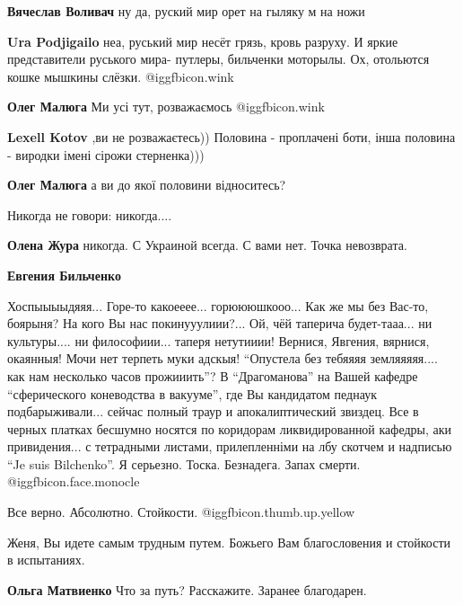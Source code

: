\begin{itemize}
\begin{itemize}
\textbf{Вячеслав Воливач} ну да, руский мир орет на гыляку м на ножи

\textbf{Ura Podjigailo} неа, руський мир несёт грязь, кровь разруху. И яркие представители руського мира- путлеры, бильченки моторылы. Ох, отольются кошке мышкины слёзки. @igg{fbicon.wink} 

\textbf{Олег Малюга} Ми усі тут, розважаємось  @igg{fbicon.wink} 

\textbf{Lexell Kotov} ,ви не розважаєтесь)) Половина - проплачені боти, інша половина - виродки імені сірожи стерненка)))

\textbf{Олег Малюга} а ви до якої половини відноситесь?
\end{itemize} %

Никогда не говори: никогда....

\begin{itemize} %
\textbf{Олена Жура} никогда. С Украиной всегда. С вами нет. Точка невозврата.

\textbf{Евгения Бильченко} 

Хоспыыыыдяяя... Горе-то какоееее... горюююшкооо... Как же мы без Вас-то, боярыня?
На кого Вы нас покинууулиии?... Ой, чёй таперича будет-тааа... ни культуры.... ни
философиии... таперя нетутииии! Вернися, Явгения, вярнися, окаянныя! Мочи нет
терпеть муки адскыя! \enquote{Опустела без тебяяяя земляяяяя.... как нам несколько часов
прожииить}? В \enquote{Драгоманова} на Вашей кафедре \enquote{сферического коневодства в
вакууме}, где Вы кандидатом педнаук подбарыживали... сейчас полный траур и
апокалиптический звиздец. Все в черных платках бесшумно носятся по коридорам
ликвидированной кафедры, аки привидения... с тетрадными листами, прилепленніми
на лбу скотчем и надписью \enquote{Je suis Bilchenko}. Я серьезно. Тоска. Безнадега.
Запах смерти.  @igg{fbicon.face.monocle} 

\end{itemize} %

Все верно. Абсолютно. Стойкости. @igg{fbicon.thumb.up.yellow} 

Женя, Вы идете самым трудным путем. Божьего Вам благословения и стойкости в испытаниях.

\begin{itemize} %
\textbf{Ольга Матвиенко} Что за путь? Расскажите. Заранее благодарен.


\end{itemize}
\end{itemize}

